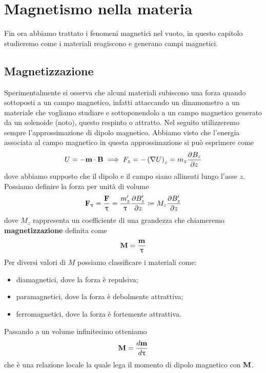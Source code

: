 \chapter{Magnetismo nella materia}
Fin ora abbiamo trattato i fenomeni magnetici nel vuoto, in questo capitolo studieremo come i materiali reagiscono e generano campi magnetici.

\section{Magnetizzazione}
Sperimentalmente si osserva che alcuni materiali subiscono una forza quando sottoposti a un campo magnetico, infatti attaccando un dinamometro a un 
materiale che vogliamo studiare e sottoponendolo a un campo magnetico generato da un solenoide (noto), questo respinto o attratto. Nel seguito utilizzeremo 
sempre l'approssimazione di dipolo magnetico. Abbiamo visto che l'energia associata al campo magnetico in questa approssimazione si può esprimere come
\begin{equation}
  U = - \mathbf{ m } \cdot \mathbf{ B } \implies F_z = - \left( \nabla U \right)_z = m_z \frac{\partial^{} {B_z}}{\partial {z}^{}}
\end{equation}
dove abbiamo supposto che il dipolo e il campo siano allineati lungo l'asse $ z $. Possiamo definire la forza per unità di volume
\begin{equation}
  \mathbf{ F }_{\uptau} = \frac{\mathbf{ F }}{\uptau} = \frac{m'_z}{\uptau} \frac{\partial B'_z }{\partial z } \coloneqq M_z \frac{\partial B'_z }{\partial z }
\end{equation}
dove $ M_z $ rappresenta un coefficiente di una grandezza che chiameremo \textbf{magnetizzazione} definita come
\begin{equation}
  \mathbf{ M } = \frac{\mathbf{ m }}{\uptau}
\end{equation}
Per diversi valori di $ M $ possiamo classificare i materiali come:
\begin{itemize}
  \item diamagnetici,  dove la forza è repulsiva;
  \item paramagnetici, dove la forza è debolmente attrattiva;
  \item ferromagnetici, dove la forza è fortemente attrattiva.
\end{itemize}
Passando a un volume infinitesimo otteniamo
\begin{equation}
  \mathbf{ M } = \frac{d \mathbf{ m }}{d \uptau}
\end{equation}
che è una relazione locale la quale lega il momento di dipolo magnetico con $ \mathbf{ M } $.

